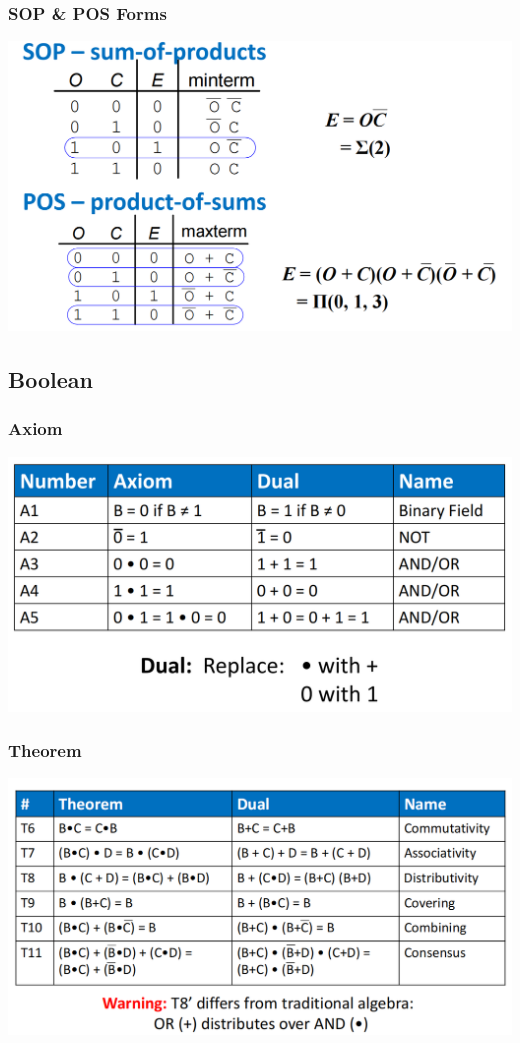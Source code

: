 \documentclass[12pt]{article}
\begin{document}
\subsubsection{SOP \& POS Forms}
\includegraphics[width=\textwidth]{SOP&POS.png}
\subsection{Boolean}
\subsubsection{Axiom}
\includegraphics[width=\textwidth]{Axioms.png}
\subsubsection{Theorem}
\includegraphics[width=\textwidth]{BooleanTheorems.png}
\end{document}
